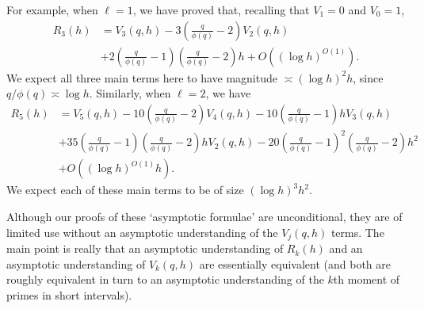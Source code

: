 \documentclass[11pt,letterpaper]{amsart}
\newcommand{\brac}[1]{\left( #1\right)}
\theoremstyle{definition}
\begin{document}
For example, when $\ell = 1$, we have proved that, recalling that $V_1=0$ and $V_0=1$, 
\begin{align*}
R_3(h) &= V_3(q,h) - 3\left(\frac{q}{\phi(q)}-2\right) V_2(q,h) \\
&+ 2\brac{\frac{q}{\phi(q)}-1}\brac{\frac{q}{\phi(q)}-2}h+O((\log h)^{O(1)}).
\end{align*}
We expect all three main terms here to have magnitude $\asymp (\log h)^{2}h$, since $q/\phi(q)\asymp \log h$. Similarly, when $\ell = 2$, we have
\begin{align*}
R_5(h) &= V_5(q,h) -10 \left(\frac{q}{\phi(q)}-2\right)V_4(q,h) - 10 \left(\frac{q}{\phi(q)}-1\right)hV_3(q,h) \\
&+ 35 \left(\frac{q}{\phi(q)}-1\right)\left(\frac{q}{\phi(q)}-2\right)hV_2(q,h) 
-20\brac{\frac{q}{\phi(q)}-1}^2\brac{\frac{q}{\phi(q)}-2}h^2
\\
&+O((\log h)^{O(1)}h).
\end{align*}
We expect each of these main terms to be of size $(\log h)^3h^2$. 

Although our proofs of these `asymptotic formulae' are unconditional, they are of limited use without an asymptotic understanding of the $V_j(q,h)$ terms. The main point is really that an asymptotic understanding of $R_k(h)$ and an asymptotic understanding of $V_k(q,h)$ are essentially equivalent (and both are roughly equivalent in turn to an asymptotic understanding of the $k$th moment of primes in short intervals). 
\end{document}
